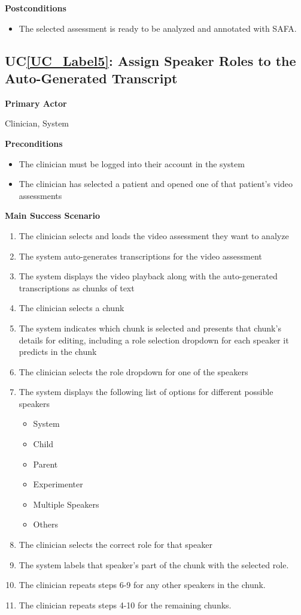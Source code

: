 \documentclass[12pt]{article}
\newcounter{ucnum} %
\newcommand{\ucref}[1]{UC\ref{#1}}
\begin{document}
\textbf{Postconditions}
\begin{itemize}
\item The selected assessment is ready to be analyzed and annotated with SAFA.
\end{itemize}

 \label{UC_Label5}
\subsection{\ucref{UC_Label5}: Assign Speaker Roles to the Auto-Generated Transcript}

\textbf{Primary Actor}

Clinician, System

\textbf{Preconditions}
\begin{itemize}
\item The clinician must be logged into their account in the system
\item The clinician has selected a patient and opened one of that patient’s video assessments
\end{itemize}

\textbf{Main Success Scenario}
\begin{enumerate}
\item The clinician selects and loads the video assessment they want to analyze 
\item The system auto-generates transcriptions for the video assessment 
\item The system displays the video playback along with the auto-generated transcriptions as chunks of text
\item The clinician selects a chunk 
\item The system indicates which chunk is selected and presents that chunk’s details for editing, including a role selection dropdown for each speaker it predicts in the chunk
\item The clinician selects the role dropdown for one of the speakers
\item The system displays the following list of options for different possible speakers
    \begin{itemize}
      \item System
      \item Child
      \item Parent
      \item Experimenter
      \item Multiple Speakers
      \item Others
    \end{itemize}
\item The clinician selects the correct role for that speaker
\item The system labels that speaker’s part of the chunk with the selected role.
\item The clinician repeats steps 6-9 for any other speakers in the chunk.
\item The clinician repeats steps 4-10 for the remaining chunks.
\end{enumerate}
\end{document}
